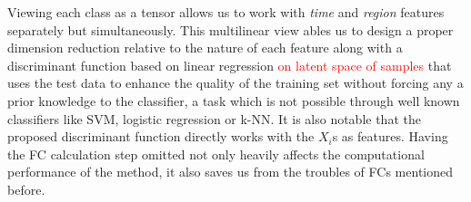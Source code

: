 \documentclass[journal]{IEEEtran}
\begin{document}
%	
	Viewing each class as a tensor allows us to work with \textit{time} and \textit{region} features separately but simultaneously. This multilinear view
	ables us to design a proper dimension reduction relative to the nature of each feature along with a discriminant function based on linear regression \textcolor{red}{on latent space of samples} that uses the test data to enhance the quality of the training set without forcing any a prior knowledge to the classifier, a task which is not possible through well known classifiers like SVM, logistic regression or k-NN. It is also notable that the proposed discriminant function directly works with the $X_i$s as features. Having the FC calculation step omitted not only heavily affects the computational performance of the method,  it also saves us from the troubles of FCs mentioned before.        
	
	
	
	
	
	
\end{document}
